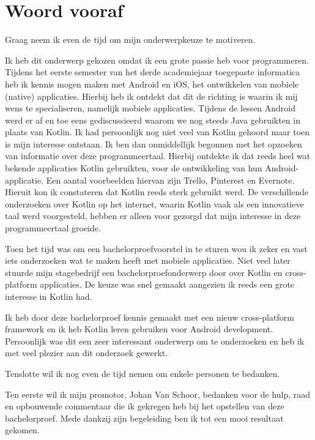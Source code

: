 
\chapter*{Woord vooraf}
\label{ch:voorwoord}

Graag neem ik even de tijd om mijn onderwerpkeuze te motiveren.

Ik heb dit onderwerp gekozen omdat ik een grote passie heb voor programmeren. Tijdens het eerste semester van het derde academiejaar toegepaste informatica heb ik kennis mogen maken met Android en iOS, het ontwikkelen van mobiele (native) applicaties. Hierbij heb ik ontdekt dat dit de richting is waarin ik mij wens te specialiseren, namelijk mobiele applicaties. Tijdens de lessen Android werd er af en toe eens gediscussieerd waarom we nog steeds Java gebruikten in plaats van Kotlin. Ik had persoonlijk nog niet veel van Kotlin gehoord maar toen is mijn interesse ontstaan. Ik ben dan onmiddellijk begonnen met het opzoeken van informatie over deze programmeertaal. Hierbij ontdekte ik dat reeds heel wat bekende applicaties Kotlin gebruikten, voor de ontwikkeling van hun Android-applicatie. Een aantal voorbeelden hiervan zijn Trello, Pinterest en Evernote. Hieruit kon ik constateren dat Kotlin reeds sterk gebruikt werd. De verschillende onderzoeken over Kotlin op het internet, waarin Kotlin vaak als een innovatieve taal werd voorgesteld, hebben er alleen voor gezorgd dat mijn interesse in deze programmeertaal groeide.

Toen het tijd was om een bachelorproefvoorstel in te sturen wou ik zeker en vast iets onderzoeken wat te maken heeft met mobiele applicaties. Niet veel later stuurde mijn stagebedrijf een bachelorproefonderwerp door over Kotlin en cross-platform applicaties. De keuze was snel gemaakt aangezien ik reeds een grote interesse in Kotlin had. 

Ik heb door deze bachelorproef kennis gemaakt met een nieuw cross-platform framework en ik heb Kotlin leren gebruiken voor Android development. Persoonlijk was dit een zeer interessant onderwerp om te onderzoeken en heb ik met veel plezier aan dit onderzoek gewerkt.

Tenslotte wil ik nog even de tijd nemen om enkele personen te bedanken.

Ten eerste wil ik mijn promotor, Johan Van Schoor, bedanken voor de hulp, raad en opbouwende commentaar die ik gekregen heb bij het opstellen van deze bachelorproef. Mede dankzij zijn begeleiding ben ik tot een mooi resultaat gekomen.

